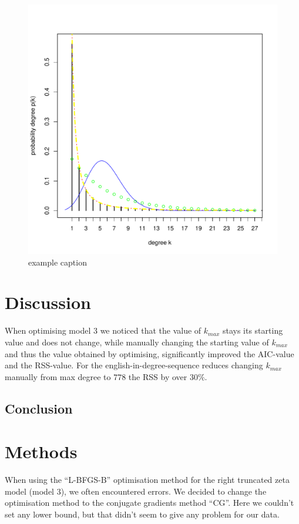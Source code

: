 \documentclass[paper=a4, fontsize=11pt]{scrartcl} %
\theoremstyle{plain}
\begin{document}
\begin{figure}[htbp] %
   \centering
   \includegraphics[width=\textwidth]{Example_image} %
   \caption{example caption}
   \label{fig:example}
\end{figure}

\section{Discussion}
When optimising model $3$ we noticed that the value of $k_{max}$ stays its starting value and does not change, while manually changing the starting value of $k_{max}$ and thus the value obtained by optimising, significantly improved the AIC-value and the RSS-value. For the english-in-degree-sequence reduces changing $k_{max}$ manually from max degree to $778$ the RSS by over $30\%$.

\subsection{Conclusion}


\section{Methods}
When using the ``L-BFGS-B'' optimisation method for the right truncated zeta model (model $3$), we often encountered errors. We decided to change the optimisation method to the conjugate gradients method ``CG''. Here we couldn't set any lower bound, but that didn't seem to give any problem for our data.\\
\end{document}
